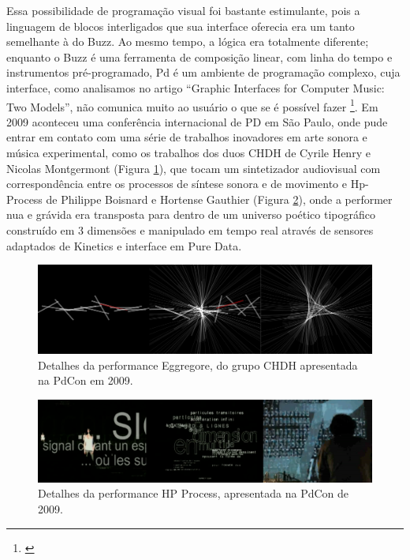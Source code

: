Essa possibilidade de programação visual foi bastante estimulante, pois a linguagem de blocos interligados que sua interface oferecia era um tanto semelhante à do Buzz. Ao mesmo tempo, a lógica era totalmente diferente; enquanto o Buzz é uma ferramenta de composição linear, com linha do tempo e instrumentos pré-programado, Pd é um ambiente de programação complexo, cuja interface, como analisamos no artigo ``Graphic Interfaces for Computer Music: Two Models'', não comunica muito ao usuário o que se é possível fazer \footnote{\cite{Stolfi2016}}. 
Em 2009 aconteceu uma conferência internacional de PD em São Paulo, onde pude entrar em contato com uma série de trabalhos inovadores em arte sonora e música experimental, como os trabalhos dos duos CHDH de Cyrile Henry e Nicolas Montgermont (Figura \ref{fig:chdh}), que tocam um sintetizador audiovisual com correspondência entre os processos de síntese sonora e de movimento e Hp-Process de Philippe Boisnard e Hortense Gauthier (Figura \ref{fig:hp}), onde a performer nua e grávida era transposta para dentro de um universo poético tipográfico construído em 3 dimensões e manipulado em tempo real através de sensores adaptados de Kinetics e interface em Pure Data. 

\begin{figure}

\includegraphics[width=1\textwidth]{pictures/cap1/CHDH}
\caption{Detalhes da performance Eggregore, do grupo CHDH apresentada na PdCon em 2009.}
\label{fig:chdh}
\end{figure}

\begin{figure}

\includegraphics[width=1\textwidth]{pictures/cap1/hp1}
\caption{Detalhes da performance HP Process, apresentada na PdCon de 2009.}
\label{fig:hp}
\end{figure}

